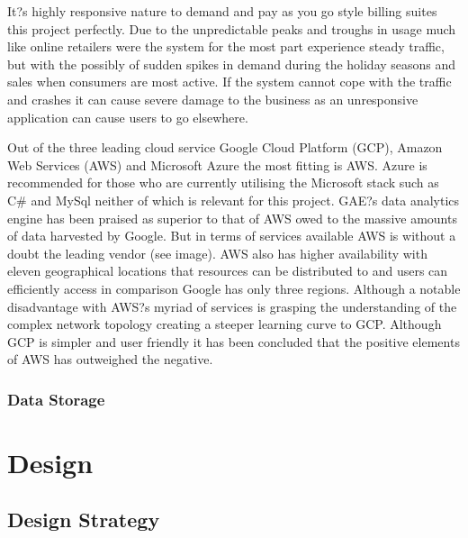 \documentclass[a4paper, 11pt]{article}
\begin{document}
It?s highly responsive nature to demand and pay as you go style billing suites this project perfectly. Due to the unpredictable peaks and troughs in usage much like online retailers were the system for the most part experience steady traffic, but with the possibly of sudden spikes in demand during the holiday seasons and sales when consumers are most active. If the system cannot cope with the traffic and crashes it can cause severe damage to the business as an unresponsive application can cause users to go elsewhere. 

Out of the three leading cloud service Google Cloud Platform (GCP), Amazon Web Services (AWS) and Microsoft Azure the most fitting is AWS. Azure is recommended for those who are currently utilising the Microsoft stack such as C\# and MySql neither of which is relevant for this project. GAE?s data analytics engine has been praised as superior to that of AWS owed to the massive amounts of data harvested by Google. But in terms of services available AWS is without a doubt the leading vendor (see image).  AWS also has higher availability with eleven geographical locations that resources can be distributed to and users can efficiently access in comparison Google has only three regions. Although a notable disadvantage with AWS?s myriad of services is grasping the understanding of the complex network topology creating a steeper learning curve to GCP. Although GCP is simpler and user friendly it has been concluded that the positive elements of AWS has outweighed the negative.

\subsubsection{Data Storage}

\clearpage

\section{Design}

\subsection{Design Strategy}
\end{document}
